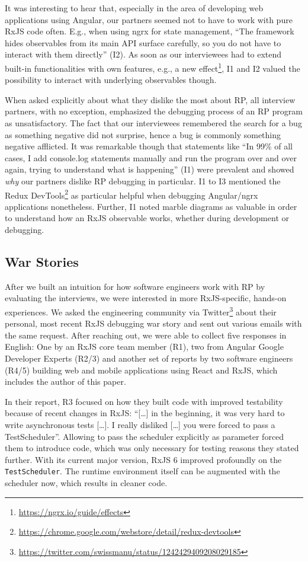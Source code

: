 \documentclass[sigplan,screen,review]{acmart}
\begin{document}
It was interesting to hear that, especially in the area of developing web applications using Angular, our partners seemed not to have to work with pure RxJS code often. E.g., when using ngrx for state management, ``The framework hides observables from its main API surface carefully, so you do not have to interact with them directly'' (I2). As soon as our interviewees had to extend built-in functionalities with own features, e.g., a new effect\footnote{\url{https://ngrx.io/guide/effects}}, I1 and I2 valued the possibility to interact with underlying observables though.

When asked explicitly about what they dislike the most about RP, all interview partners, with no exception, emphasized the debugging process of an RP program as unsatisfactory. The fact that our interviewees remembered the search for a bug as something negative did not surprise, hence a bug is commonly something negative afflicted. It was remarkable though that statements like ``In 99\% of all cases, I add console.log statements manually and run the program over and over again, trying to understand what is happening'' (I1) were prevalent and showed \emph{why} our partners dislike RP debugging in particular. I1 to I3 mentioned the Redux DevTools\footnote{\url{https://chrome.google.com/webstore/detail/redux-devtools}} as particular helpful when debugging Angular/ngrx applications nonetheless. Further, I1 noted marble diagrams as valuable in order to understand how an RxJS observable works, whether during development or debugging.

\subsection{War Stories}

After we built an intuition for how software engineers work with RP by evaluating the interviews, we were interested in more RxJS-specific, hands-on experiences. We asked the engineering community via Twitter\footnote{\url{https://twitter.com/swissmanu/status/1242429409208029185}} about their personal, most recent RxJS debugging war story and sent out various emails with the same request. After reaching out, we were able to collect five responses in English: One by an RxJS core team member (R1), two from Angular Google Developer Experts (R2/3) and another set of reports by two software engineers (R4/5) building web and mobile applications using React and RxJS, which includes the author of this paper.

In their report, R3 focused on how they built code with improved testability because of recent changes in RxJS: ``[\dots] in the beginning, it was very hard to write asynchronous tests [\dots]. I really disliked [\dots] you were forced to pass a TestScheduler''. Allowing to pass the scheduler explicitly as parameter forced them to introduce code, which was only necessary for testing reasons they stated further. With its current major version, RxJS 6 improved profoundly on the  \texttt{TestScheduler}. The runtime environment itself can be augmented with the scheduler now, which results in cleaner code.
\end{document}
